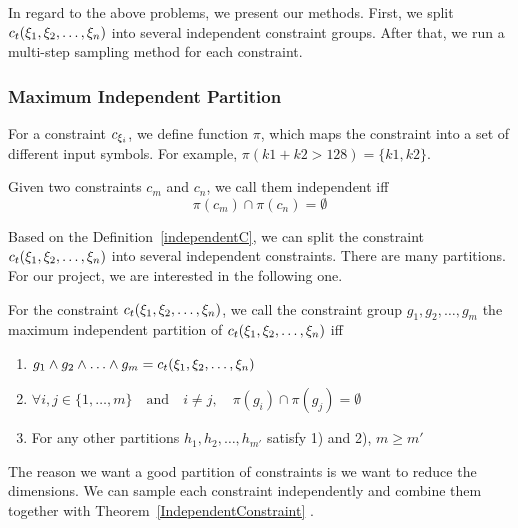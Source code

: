 In regard to the above problems, we present our methods. First, we split
$c_t({\xi}_{1},{\xi}_{2},\ldots,{\xi}_{n})$ into several independent constraint
groups. After that, we run a multi-step sampling method for each constraint.

\subsubsection{Maximum Independent Partition}

For a constraint $c_{{\xi}_{i}}$, we define function $\pi$, which maps the
constraint into a set of different input symbols. For example, $\pi(k1 + k2 >
128) = \{k1, k2\}$.

\begin{mydef}[]
      \label{independentC}
      Given two constraints $c_m$ and $c_n$, we call them independent iff
      $$\pi(c_m) \cap \pi(c_n) = \emptyset$$
\end{mydef}

Based on the Definition~\ref{independentC}, we can split the constraint
$c_t({\xi}_{1},{\xi}_{2},\ldots,{\xi}_{n})$ into several independent constraints.
There are many partitions. For our project, we are interested in the following
one.

\begin{mydef}\label{Goodpartition}
      For the constraint $c_t({\xi}_{1},{\xi}_{2},\ldots,{\xi}_{n})$,
      we call the constraint group
      $g_{1}, g_{2}, \ldots, g_{m}$
      the maximum independent partition of $c_t({\xi}_{1},{\xi}_{2},\ldots,{\xi}_{n})$ iff
      \begin{enumerate}
            \item $g_{1} \land g_{2} \land \ldots \land g_{m} = c_t({\xi}_{1},{\xi}_{2},\ldots,{\xi}_{n})$
            \item $\forall i, j \in \{1, \ldots, m\} \quad \textrm{and} \quad
                        i \neq j,\quad\pi(g_{i}) \cap \pi(g_{j}) = \emptyset $
            \item For any other partitions  $h_{1}, h_{2}, \ldots, h_{m'}$ satisfy 1) and
                  2), $m \geq m'$
      \end{enumerate}

\end{mydef}

The reason we want a good partition of constraints is we want to reduce
the dimensions. 
We can sample each constraint independently and combine them together
with Theorem~\ref{IndependentConstraint} .

